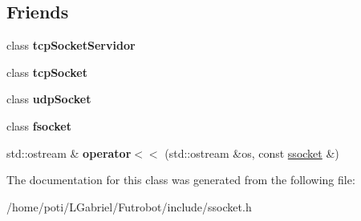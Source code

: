 \subsection*{Friends}
\begin{DoxyCompactItemize}
\item 
class {\bfseries tcp\+Socket\+Servidor}\hypertarget{classssocket_a973b893c45251060e85966750e827e78}{}\label{classssocket_a973b893c45251060e85966750e827e78}

\item 
class {\bfseries tcp\+Socket}\hypertarget{classssocket_a2a2ed79c6b1fced5ca6ad7fb21f489c0}{}\label{classssocket_a2a2ed79c6b1fced5ca6ad7fb21f489c0}

\item 
class {\bfseries udp\+Socket}\hypertarget{classssocket_a75668b18912dc4d37bfe32b2f86a6aae}{}\label{classssocket_a75668b18912dc4d37bfe32b2f86a6aae}

\item 
class {\bfseries fsocket}\hypertarget{classssocket_ac6d97e52b58a5356472ded836926c2a1}{}\label{classssocket_ac6d97e52b58a5356472ded836926c2a1}

\item 
std\+::ostream \& {\bfseries operator$<$$<$} (std\+::ostream \&os, const \hyperlink{classssocket}{ssocket} \&)\hypertarget{classssocket_ac12b78f067212d3a4e3b435265d281f3}{}\label{classssocket_ac12b78f067212d3a4e3b435265d281f3}

\end{DoxyCompactItemize}


The documentation for this class was generated from the following file\+:\begin{DoxyCompactItemize}
\item 
/home/poti/\+L\+Gabriel/\+Futrobot/include/ssocket.\+h\end{DoxyCompactItemize}
